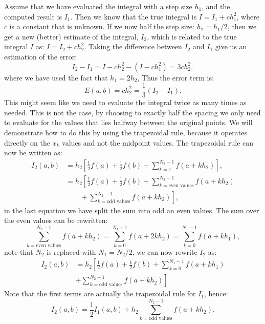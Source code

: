 \documentclass[graybox,sectrefs,envcountresetchap,open=right,final]{svmonodo}
\begin{document}
Assume that we have evaluated the integral with a step size $h_1$, and the computed result is $I_1$. 
Then we know that the true integral is $I=I_1+c h_1^2$, where $c$ is a constant that is unknown. If we now half the step size: $h_2=h_1/2$, 
then we get a new (better) estimate of the integral, $I_2$, which is related to the true integral $I$ as: $I=I_2+c h_2^2$. 
Taking the difference between $I_2$ and $I_1$ give us an estimation of the error:
\begin{equation}
I_2-I_1=I-c h_2^2-(I-ch_1^2)=3c h_2^2,
\end{equation}
where we have used the fact that $h_1=2h_2$, Thus the error term is:
\begin{equation}
E(a,b)=c h_2^2=\frac{1}{3}(I_2-I_1).
\end{equation}
This might seem like we need to evaluate the integral twice as many times as needed. This is not the case, by choosing to exactly 
half the spacing we only need to evaluate for the values that lies halfway between the original points. We will demonstrate how 
to do this by using the trapezoidal rule, because it operates directly on the $x_k$ values and not the midpoint values. 
The trapezoidal rule can now be written as:
\begin{align}
I_2(a,b)&=h_2\left[\frac{1}{2}f(a)+\frac{1}{2}f(b)+\sum_{k=1}^{N_2-1}f(a+k h_2)\right],\\ 
&=h_2\left[\frac{1}{2}f(a)+\frac{1}{2}f(b)+\sum_{k=\text{even values}}^{N_2-1}f(a+k h_2)\right.\nonumber\\ 
&\left.\qquad+\sum_{k=\text{odd values}}^{N_2-1}f(a+k h_2)\right],
\end{align}
in the last equation we have split the sum into odd an even values. The sum over the even values can be rewritten:
\begin{equation}
\sum_{k=\text{even values}}^{N_2-1}f(a+k h_2)=\sum_{k=0}^{N_1-1}f(a+2k h_2)=\sum_{k=0}^{N_1-1}f(a+k h_1),
\end{equation}
note that $N_2$ is replaced with $N_1=N_2/2$, we can now rewrite $I_2$ as:
\begin{align}
I_2(a,b)&=h_2\left[\frac{1}{2}f(a)+\frac{1}{2}f(b)+\sum_{k=0}^{N_1-1}f(a+k h_1)\right.\nonumber\\ 
&\left.+\sum_{k=\text{odd values}}^{N_2-1}f(a+k h_2)\right]
\end{align}
Note that the first terms are actually the trapezoidal rule for $I_1$, hence:
\begin{equation}
I_2(a,b)=\frac{1}{2}I_1(a,b)+h_2\sum_{k=\text{odd values}}^{N_2-1}f(a+k h_2).
\end{equation}
\end{document}

